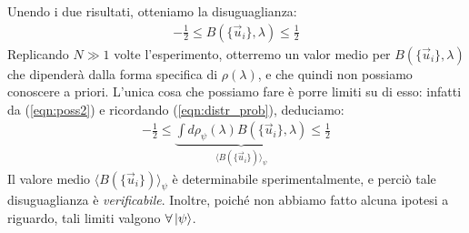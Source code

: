 \documentclass[../../FisicaTeorica.tex]{subfiles}
\begin{document}
Unendo i due risultati, otteniamo la disuguaglianza:
\begin{align}
-\frac{1}{2} \leq B(\{\vec{u}_i\}, \lambda) \leq \frac{1}{2}
\label{eqn:poss2}
\end{align}
Replicando $N\gg 1$ volte l'esperimento, otterremo un valor medio per $B(\{\vec{u}_i\},\lambda)$ che dipenderà dalla forma specifica di $\rho(\lambda)$, e che quindi non possiamo conoscere a priori. L'unica cosa che possiamo fare è porre limiti su di esso: infatti da (\ref{eqn:poss2}) e ricordando (\ref{eqn:distr_prob}), deduciamo:
\begin{align}
-\frac{1}{2} \leq \underbrace{\int d\rho_\psi(\lambda) B(\{\vec{u}_i\},\lambda)}_{\langle B(\{\vec{u}_i\})\rangle_\psi}\leq \frac{1}{2}
\label{eqn:bell-1}
\end{align}
Il valore medio $\langle B(\{\vec{u}_i\})\rangle_\psi$ è determinabile sperimentalmente, e perciò tale disuguaglianza è \textit{verificabile}. Inoltre, poiché non abbiamo fatto alcuna ipotesi a riguardo, tali limiti valgono $\forall \Ket{\psi}$.\\
\end{document}
